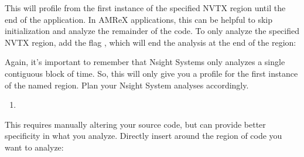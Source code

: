 \documentclass[letterpaper,10pt,english]{sphinxmanual}
\begin{document}
\begin{sphinxVerbatim}[commandchars=\\\{\}]
\end{sphinxVerbatim}

\sphinxAtStartPar
This will profile from the first instance of the specified NVTX region until the end of the
application.  In AMReX applications, this can be helpful to skip initialization and analyze the
remainder of the code.  To only analyze the specified NVTX region, add the flag , which
will end the analysis at the end of the region:

\begin{sphinxVerbatim}[commandchars=\\\{\}]
\end{sphinxVerbatim}

\sphinxAtStartPar
Again, it’s important to remember that Nsight Systems only analyzes a single contiguous block of
time. So, this will only give you a profile for the first instance of the named region.  Plan your
Nsight System analyses accordingly.
\begin{enumerate}
%
\setcounter{enumi}{1}
\item {} 
\sphinxAtStartPar
{}

\end{enumerate}

\sphinxAtStartPar
This requires manually altering your source code, but can provide better specificity in what you analyze.
Directly insert  around the region of code you want to analyze:

\begin{sphinxVerbatim}[commandchars=\\\{\}]


\end{sphinxVerbatim}
\end{document}
